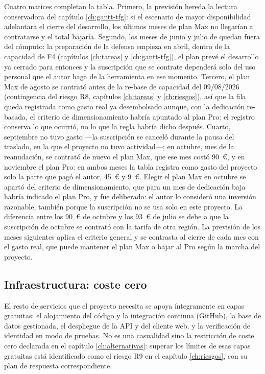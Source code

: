 Cuatro matices completan la tabla.
Primero, la previsión hereda la lectura conservadora del capítulo \ref{ch:gantt-tfg}: si el escenario de mayor disponibilidad adelantara el cierre del desarrollo, los últimos meses de plan Max no llegarían a contratarse y el total bajaría.
Segundo, los meses de junio y julio de \thesisYear{} quedan fuera del cómputo: la preparación de la defensa empieza en abril, dentro de la capacidad de F4 (capítulos \ref{ch:tareas} y \ref{ch:gantt-tfg}), el plan prevé el desarrollo ya cerrado para entonces y la suscripción que se contrate dependerá solo del uso personal que el autor haga de la herramienta en ese momento.
Tercero, el plan Max de agosto se contrató antes de la re-base de capacidad del 09/08/2026 (contingencia del riesgo R8, capítulos \ref{ch:tareas} y \ref{ch:riesgos}), así que la fila queda registrada como gasto real ya desembolsado aunque, con la dedicación re-basada, el criterio de dimensionamiento habría apuntado al plan Pro: el registro conserva lo que ocurrió, no lo que la regla habría dicho después.
Cuarto, septiembre no tuvo gasto —la suscripción se canceló durante la pausa del traslado, en la que el proyecto no tuvo actividad—; en octubre, mes de la reanudación, se contrató de nuevo el plan Max, que ese mes costó 90~€, y en noviembre el plan Pro: en ambos meses la tabla registra como gasto del proyecto solo la parte que pagó el autor, 45~€ y 9~€.
Elegir el plan Max en octubre se apartó del criterio de dimensionamiento, que para un mes de dedicación baja habría indicado el plan Pro, y fue deliberado: el autor lo consideró una inversión razonable, también porque la suscripción no se usa solo en este proyecto.
La diferencia entre los 90~€ de octubre y los 93~€ de julio se debe a que la suscripción de octubre se contrató con la tarifa de otra región.
La previsión de los meses siguientes aplica el criterio general y se contrasta al cierre de cada mes con el gasto real, que puede mantener el plan Max o bajar al Pro según la marcha del proyecto.

\subsection{Infraestructura: coste cero}
\label{sec:gasto-infraestructura}

El resto de servicios que el proyecto necesita se apoya íntegramente en capas gratuitas: el alojamiento del código y la integración continua (GitHub), la base de datos gestionada, el despliegue de la \ac{API} y del cliente web, y la verificación de identidad en modo de pruebas.
No es una casualidad sino la restricción de coste cero declarada en el capítulo \ref{ch:alternativas}: superar los límites de esas capas gratuitas está identificado como el riesgo R9 en el capítulo \ref{ch:riesgos}, con su plan de respuesta correspondiente.

